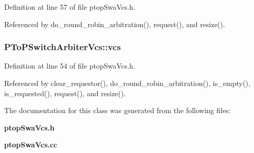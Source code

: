 Definition at line 57 of file ptopSwaVcs.h.

Referenced by do\_\-round\_\-robin\_\-arbitration(), request(), and resize().
\subsubsection[{vcs}]{ {\bf PToPSwitchArbiterVcs::vcs}\hspace{0.3cm}{\tt  [private]}}\label{classPToPSwitchArbiterVcs_119836b981999b12f4cc2d9c8b9cdcbc}




Definition at line 54 of file ptopSwaVcs.h.

Referenced by clear\_\-requestor(), do\_\-round\_\-robin\_\-arbitration(), is\_\-empty(), is\_\-requested(), request(), and resize().

The documentation for this class was generated from the following files:\begin{CompactItemize}
\item 
{\bf ptopSwaVcs.h}\item 
{\bf ptopSwaVcs.cc}\end{CompactItemize}
